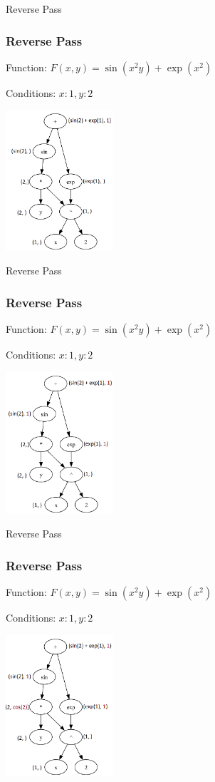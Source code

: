 \documentclass{beamer}
\begin{document}
\begin{frame}{Reverse Pass}
\frametitle{Reverse Pass}

Function: $F(x, y) = \sin(x^2 y) + \exp(x^2)$

Conditions: ${x:1, y:2}$
\begin{center}
    \includegraphics[width=4cm]{DAG_gif_images/rv_1_fix_1.png}
\end{center}
\end{frame}

\begin{frame}{Reverse Pass}
\frametitle{Reverse Pass}

Function: $F(x, y) = \sin(x^2 y) + \exp(x^2)$

Conditions: ${x:1, y:2}$
\begin{center}
    \includegraphics[width=4cm]{DAG_gif_images/rv_1_fix_2.png}
\end{center}
\end{frame}

\begin{frame}{Reverse Pass}
\frametitle{Reverse Pass}

Function: $F(x, y) = \sin(x^2 y) + \exp(x^2)$

Conditions: ${x:1, y:2}$
\begin{center}
    \includegraphics[width=4cm]{DAG_gif_images/rv_1_fix_3.png}
\end{center}
\end{frame}
\end{document}
